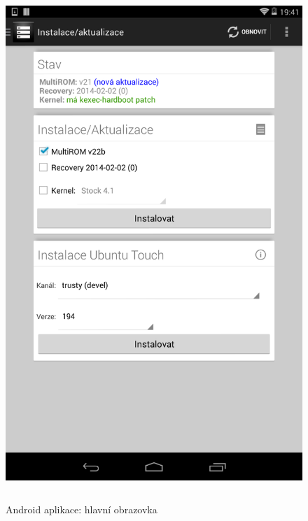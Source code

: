 \documentclass[12pt, a4paper, oneside]{article}
\begin{document}
\begin{figure}[H]
\begin{center}
 \includegraphics[height=550pt]{img/app_main.png}
\caption{Android aplikace: hlavní obrazovka}
\end{center}
\end{figure}
\end{document}
